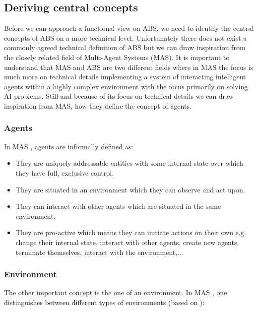 \subsection{Deriving central concepts}
Before we can approach a functional view on ABS, we need to identify the central concepts of ABS on a more technical level. Unfortunately there does not exist a commonly agreed technical definition of ABS but we can draw inspiration from the closely related field of Multi-Agent Systems (MAS). It is important to understand that MAS and ABS are two different fields where in MAS the focus is much more on technical details implementing a system of interacting intelligent agents within a highly complex environment with the focus primarily on solving AI problems. Still and because of its focus on technical details we can draw inspiration from MAS, how they define the concept of agents.

\subsubsection{Agents}
In MAS \cite{wooldridge_introduction_2009}, \cite{weiss_multiagent_2013} agents are informally defined as:

\begin{itemize}
	\item They are uniquely addressable entities with some internal state over which they have full, exclusive control.
	\item They are situated in an environment which they can observe and act upon.
	\item They can interact with other agents which are situated in the same environment.
	\item They are pro-active which means they can initiate actions on their own e.g. change their internal state, interact with other agents, create new agents, terminate themselves, interact with the environment,...
\end{itemize}

\subsubsection{Environment}
The other important concept is the one of an environment. In MAS \cite{wooldridge_introduction_2009}, \cite{weiss_multiagent_2013} one distinguishes between different types of environments (based on \cite{russell_artificial_2010}):

